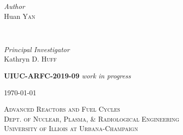 \documentclass[14pt,a4paper]{article} %
\begin{document}
\begin{titlepage}
    \begin{minipage}{0.4\textwidth}
        \begin{flushleft}
            \large
            \textit{Author}\\
            Huan \textsc{Yan}\\
        \end{flushleft}
    \end{minipage}
    ~
    \begin{minipage}{0.4\textwidth}
        \begin{flushright}
            \large
            \textit{Principal Investigator}\\
            Kathryn D. \textsc{Huff} %
        \end{flushright}
    \end{minipage}
    

    \vspace{1cm}
    \textsc{\LARGE\bfseries UIUC-ARFC-2019-09} \textit{work in progress} %
    \vspace{0.5cm}
    
    
    \vspace{0.5cm} %
    {\large\today} %
    \vspace{0.5cm}

    
    \textsc{\LARGE Advanced Reactors and Fuel Cycles}\\[0.25cm] %
    
    \textsc{\large Dept. of Nuclear, Plasma, \& Radiological Engineering}\\%
    
    \textsc{\large University of Illiois at Urbana-Champaign}\\ %



\end{titlepage}
\end{document}

